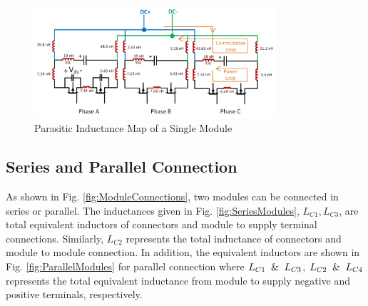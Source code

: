\begin{figure}
    \centering
    \includegraphics[width=0.8\textwidth]{figures/SingleModuleInductanceMap.jpg}
    \caption{Parasitic Inductance Map of a Single Module}
    \label{fig:SingleModuleInductanceMap}
\end{figure}





\subsection{Series and Parallel Connection}

As shown in Fig. \ref{fig:ModuleConnections}, two modules can be connected in series or parallel. The inductances given in Fig. \ref{fig:SeriesModules}, $L_{C1}, L_{C3}$, are total equivalent inductors of connectors and module to supply terminal connections. Similarly, $L_{C2}$ represents the total inductance of connectors and module to module connection. In addition, the equivalent inductors are shown in Fig. \ref{fig:ParallelModules} for parallel connection where $L_{C1} \And L_{C3}$, $L_{C2} \And L_{C4}$  represents the total equivalent inductance from module to supply negative and positive terminals, respectively.





